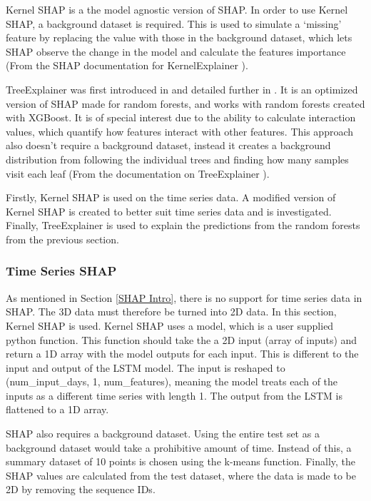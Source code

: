 \documentclass[12pt]{article}
\begin{document}
Kernel SHAP is a the model agnostic version of SHAP. In order to use Kernel SHAP, a background dataset is required. This is used to simulate a `missing' feature by replacing the value with those in the background dataset, which lets SHAP observe the change in the model and calculate the features importance (From the SHAP documentation for KernelExplainer \cite{SHAP}).

TreeExplainer was first introduced in \cite{SHAPInteraction} and detailed further in \cite{TreeExplainer}. It is an optimized version of SHAP made for random forests, and works with random forests created with XGBoost. It is of special interest due to the ability to calculate interaction values, which quantify how features interact with other features. This approach also doesn't require a background dataset, instead it creates a background distribution from following the individual trees and finding how many samples visit each leaf (From the documentation on TreeExplainer \cite{SHAP}).

Firstly, Kernel SHAP is used on the time series data. A modified version of Kernel SHAP is created to better suit time series data and is investigated. Finally, TreeExplainer is used to explain the predictions from the random forests from the previous section. 

\subsubsection{Time Series SHAP}
\label{Time Series SHAP}
As mentioned in Section \ref{SHAP Intro}, there is no support for time series data in SHAP. The 3D data must therefore be turned into 2D data. In this section, Kernel SHAP is used. Kernel SHAP uses a model, which is a user supplied python function. This function should take the a 2D input (array of inputs) and return a 1D array with the model outputs for each input. This is different to the input and output of the LSTM model. The input is reshaped to (num\_input\_days, 1, num\_features), meaning the model treats each of the inputs as a different time series with length 1. The output from the LSTM is flattened to a 1D array. 

SHAP also requires a background dataset. Using the entire test set as a background dataset would take a prohibitive amount of time. Instead of this, a summary dataset of 10 points is chosen using the k-means function. Finally, the SHAP values are calculated from the test dataset, where the data is made to be 2D by removing the sequence IDs. 
\end{document}
